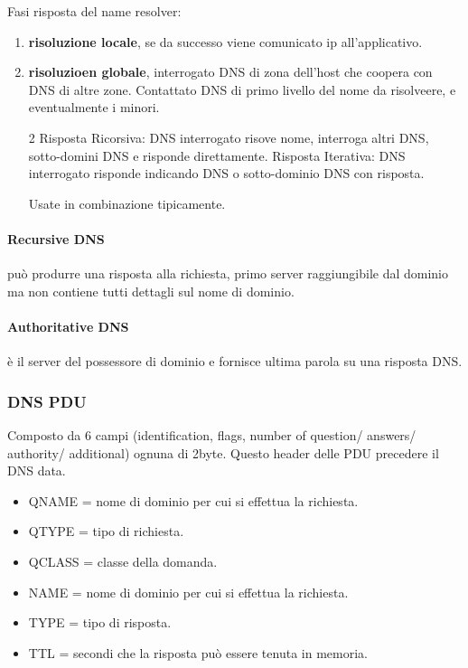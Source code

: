 Fasi risposta del name resolver:
\begin{enumerate}
	\item \textbf{risoluzione locale}, se da successo viene comunicato ip all'applicativo.
	\item \textbf{risoluzioen globale}, interrogato DNS di zona dell'host che coopera con DNS di altre zone. Contattato DNS di primo livello del nome da risolveere, e eventualmente i minori.
	\begin{paracol}{2}
		Risposta Ricorsiva: DNS interrogato risove nome, interroga altri DNS, sotto-domini DNS e risponde direttamente.
		\switchcolumn
		Risposta Iterativa: DNS interrogato risponde indicando DNS o sotto-dominio DNS con risposta.
	\end{paracol}
	Usate in combinazione tipicamente.
\end{enumerate}

\paragraph{Recursive DNS} può produrre una risposta alla richiesta, primo server raggiungibile dal dominio ma non contiene tutti dettagli sul nome di dominio.
\paragraph{Authoritative DNS} è il server del possessore di dominio e fornisce ultima parola su una risposta DNS.
\subsubsection{DNS PDU}
Composto da 6 campi (identification, flags, number of question/ answers/ authority/ additional) ognuna di 2byte. Questo header delle PDU precedere il DNS data.
\begin{itemize}
	\item QNAME = nome di dominio per cui si effettua la richiesta.
	\item QTYPE = tipo di richiesta.
	\item QCLASS = classe della domanda.
\end{itemize}
\begin{itemize}
	\item NAME = nome di dominio per cui si effettua la richiesta.
	\item TYPE = tipo di risposta.
	\item TTL = secondi che la risposta può essere tenuta in memoria.
\end{itemize}
